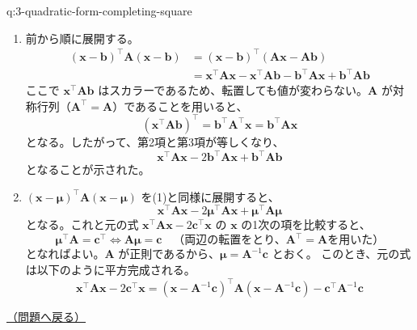 \documentclass[
  pandoc]{bxjsarticle}
\providecommand{\tightlist}{%
  \setlength{\itemsep}{0pt}\setlength{\parskip}{0pt}}
\begin{document}
\begin{answerbox}[phantomlabel=a:3-quadratic-form-completing-square]{q:3-quadratic-form-completing-square}

\begin{enumerate}
\def\labelenumi{\arabic{enumi}.}
\tightlist
\item
  前から順に展開する。 \begin{align*}
  (\mathbf{x} - \mathbf{b})^\top \mathbf{A} (\mathbf{x} - \mathbf{b})
  &= (\mathbf{x} - \mathbf{b})^\top (\mathbf{A}\mathbf{x} - \mathbf{A}\mathbf{b}) \\
  &= \mathbf{x}^\top \mathbf{A}\mathbf{x} - \mathbf{x}^\top \mathbf{A}\mathbf{b} - \mathbf{b}^\top \mathbf{A}\mathbf{x} + \mathbf{b}^\top \mathbf{A}\mathbf{b}
  \end{align*} ここで \(\mathbf{x}^\top \mathbf{A}\mathbf{b}\)
  はスカラーであるため、転置しても値が変わらない。\(\mathbf{A}\)
  が対称行列（\(\mathbf{A}^\top = \mathbf{A}\)）であることを用いると、
  \[
  (\mathbf{x}^\top \mathbf{A}\mathbf{b})^\top = \mathbf{b}^\top \mathbf{A}^\top \mathbf{x} = \mathbf{b}^\top \mathbf{A}\mathbf{x}
  \] となる。したがって、第2項と第3項が等しくなり、 \[
  \mathbf{x}^\top \mathbf{A} \mathbf{x} - 2\mathbf{b}^\top \mathbf{A} \mathbf{x} + \mathbf{b}^\top \mathbf{A} \mathbf{b}
  \] となることが示された。
\item
  \((\mathbf{x} - \boldsymbol{\mu})^\top \mathbf{A} (\mathbf{x} - \boldsymbol{\mu})\)
  を(1)と同様に展開すると、 \[
  \mathbf{x}^\top \mathbf{A} \mathbf{x} - 2\boldsymbol{\mu}^\top \mathbf{A} \mathbf{x} + \boldsymbol{\mu}^\top \mathbf{A} \boldsymbol{\mu}
  \] となる。これと元の式
  \(\mathbf{x}^\top \mathbf{A} \mathbf{x} - 2\mathbf{c}^\top \mathbf{x}\)
  の \(\mathbf{x}\) の1次の項を比較すると、 \[
  \boldsymbol{\mu}^\top \mathbf{A} = \mathbf{c}^\top \iff \mathbf{A}\boldsymbol{\mu} = \mathbf{c} \quad \text{（両辺の転置をとり、$\mathbf{A}^\top=\mathbf{A}$を用いた）}
  \] となればよい。\(\mathbf{A}\)
  が正則であるから、\(\boldsymbol{\mu} = \mathbf{A}^{-1}\mathbf{c}\)
  とおく。 このとき、元の式は以下のように平方完成される。 \[
  \mathbf{x}^\top \mathbf{A} \mathbf{x} - 2\mathbf{c}^\top \mathbf{x} = (\mathbf{x} - \mathbf{A}^{-1}\mathbf{c})^\top \mathbf{A} (\mathbf{x} - \mathbf{A}^{-1}\mathbf{c}) - \mathbf{c}^\top \mathbf{A}^{-1} \mathbf{c}
  \]
\end{enumerate}

\hfill 

\hyperref[q:3-quadratic-form-completing-square]{（問題へ戻る）}

\end{answerbox}
\end{document}
